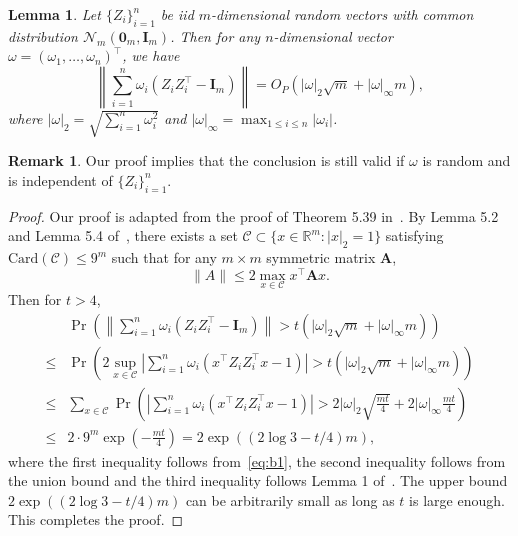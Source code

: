 \documentclass[12pt]{article} %
\newcommand{\bA}{\mathbf{A}}
\newcommand{\bI}{\mathbf{I}}
\newtheorem{lemma}{Lemma}
\theoremstyle{definition}
\newtheorem{remark}{Remark}
\begin{document}
\begin{appendices}
\begin{lemma}\label{lemma:con}
    Let $\{Z_i\}_{i=1}^n$ be iid $m$-dimensional random vectors with common distribution $\mathcal{N}_m(\mathbf{0}_m,\bI_m)$.
    Then for any $n$-dimensional vector $\omega=(\omega_1,\ldots,\omega_n)^\top$, we have
\begin{equation*}
    \left\|\sum_{i=1}^n \omega_i(Z_i Z_i^\top - \bI_m)\right\|=O_P(|\omega|_2 \sqrt{m}+|\omega|_{\infty}m),
\end{equation*}
where $|\omega|_2=\sqrt{\sum_{i=1}^n \omega_i^2}$ and $|\omega|_{\infty}=\max_{1\leq i\leq n}|\omega_i|$.
\end{lemma}
\begin{remark}
    Our proof implies that the conclusion is still valid if $\omega$ is random and is independent of $\{Z_i\}_{i=1}^n$.
\end{remark}
\begin{proof}
    Our proof is adapted from the proof of Theorem 5.39 in~\cite{Vershynin2010Introduction}.
    By Lemma 5.2 and Lemma 5.4 of~\cite{Vershynin2010Introduction}, there exists a set $\mathcal{C}\subset \{x\in\mathbb{R}^m: |x|_2=1\}$ satisfying $\text{Card} (\mathcal{C})\leq 9^m$ such that for any $m\times m$ symmetric matrix $\bA$,
    \begin{equation}\label{eq:b1}
    \|A\|\leq 2\max_{x\in\mathcal{C}} x^\top \bA x.
\end{equation}
Then for $t>4$, 
\begin{equation*}
    \begin{split}
        &\Pr\left(
            \left\|\sum_{i=1}^n \omega_i(Z_i Z_i^\top - \bI_m)\right\|
            > t (|\omega|_2 \sqrt{m}+|\omega|_{\infty} m)
        \right)
        \\
        \leq &
        \Pr\left(
            2\sup_{x\in\mathcal{C}}\left|\sum_{i=1}^n \omega_i(x^\top Z_i Z_i^\top x - 1)\right|
            > t (|\omega|_2 \sqrt{m}+|\omega|_{\infty} m)
        \right)
        \\
        \leq &
        \sum_{x\in\mathcal{C}}
        \Pr\left(
            \left|\sum_{i=1}^n \omega_i(x^\top Z_i Z_i^\top x - 1)\right|
            >  2 |\omega|_2 \sqrt{\frac{mt}{4}}+2|\omega|_{\infty} \frac{mt}{4}
        \right)
        \\
        \leq & 2\cdot 9^{m} \exp\left(-\frac{mt}{4}\right)
        =2\exp\left((2\log 3 -t/4)m\right)
        ,
    \end{split}
\end{equation*}
where the first inequality follows from~\eqref{eq:b1}, the second inequality follows from the union bound and the third inequality follows Lemma 1 of~\cite{Laurent2000Adaptive}.
The upper bound $2\exp\left((2\log 3 -t/4)m\right)$ can be arbitrarily small as long as $t$ is large enough.
This completes the proof.
\end{proof}





\end{appendices}
\end{document}
